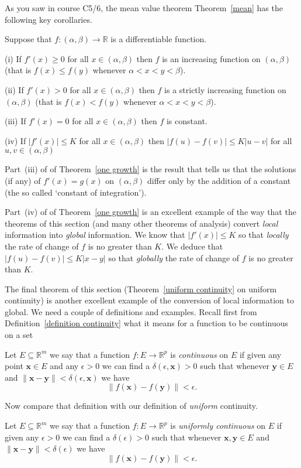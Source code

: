 As you saw in course C5/6, the mean value theorem  
Theorem~\ref{mean} has the following key corollaries.
\begin{theorem}\label{one growth} Suppose that
$f:(\alpha,\beta)\rightarrow {\mathbb  R}$
is a differentiable function.

(i) If $f'(x)\geq 0$ for all $x\in (\alpha,\beta)$
then $f$ is an increasing function 
on $(\alpha,\beta)$ (that is $f(x)\leq f(y)$ whenever
$\alpha<x<y<\beta$).

(ii) If $f'(x)> 0$ for all $x\in (\alpha,\beta)$
then $f$ is a strictly increasing function 
on $(\alpha,\beta)$ (that is $f(x)<f(y)$ whenever
$\alpha<x<y<\beta$).

(iii) If $f'(x)=0$ for all $x\in (\alpha,\beta)$
then $f$ is constant.

(iv) If $|f'(x)|\leq K$ for all $x\in (\alpha,\beta)$
then $|f(u)-f(v)|\leq K|u-v|$ for all $u,v\in (\alpha,\beta)$
\end{theorem}

Part~(iii) of of Theorem~\ref{one growth} is the result
that tells us that the solutions (if any)
of $f'(x)=g(x)$ on $(\alpha,\beta)$ differ only by
the addition of a constant (the so called
`constant of integration'). 

Part~(iv) of of Theorem~\ref{one growth} is an excellent
example of the way that the theorems of this section
(and many other theorems of analysis) convert \emph{local}
information into \emph{global} information. We know
that $|f'(x)|\leq K$ so that \emph{locally} the rate
of change of $f$ is no greater than $K$. We deduce that
$|f(u)-f(v)|\leq K|x-y|$ so that \emph{globally} the rate
of change of $f$ is no greater than $K$.

The final theorem of this section (Theorem~\ref{uniform continuity}
on uniform continuity) is another excellent example of the
conversion of local information to global. We need
a couple of definitions and examples. Recall first
from Definition~\ref{definition continuity} what
it means for a function to be continuous on a set
\begin{definition}\label{pointwise continuity}
Let $E\subseteq{\mathbb R}^{m}$
we say that a function $f:E\rightarrow{\mathbb R}^{p}$
is \emph{continuous} on $E$ if given any point ${\mathbf x}\in E$
and any $\epsilon>0$ we can find a 
$\delta(\epsilon,{\mathbf x})>0$ such that
whenever ${\mathbf y}\in E$ and
$\|{\mathbf x}-{\mathbf y}\|<\delta(\epsilon,{\mathbf x})$
we have 
\[\|f({\mathbf x})-f({\mathbf y})\|<\epsilon.\]
\end{definition}
Now compare that definition with our definition of
\emph{uniform} continuity.
\begin{definition}\label{definition uniform continuity}
Let $E\subseteq{\mathbb R}^{m}$
we say that a function $f:E\rightarrow{\mathbb R}^{p}$
is \emph{uniformly continuous} on $E$ 
if given any 
$\epsilon>0$ we can find a 
$\delta(\epsilon)>0$ such that
whenever ${\mathbf x},{\mathbf y}\in E$ and
$\|{\mathbf x}-{\mathbf y}\|<\delta(\epsilon)$
we have 
\[\|f({\mathbf x})-f({\mathbf y})\|<\epsilon.\]
\end{definition}


